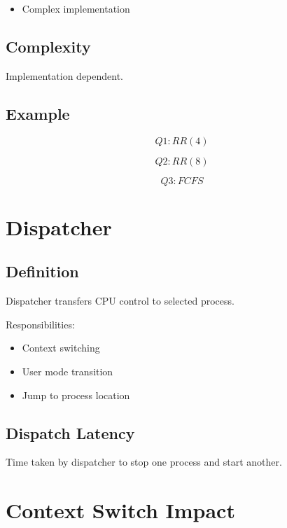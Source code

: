 \begin{itemize}
\item Complex implementation
\end{itemize}

\subsection{Complexity}

Implementation dependent.

\subsection{Example}

\[
Q1: RR(4)
\]

\[
Q2: RR(8)
\]

\[
Q3: FCFS
\]

\section{Dispatcher}

\subsection{Definition}

Dispatcher transfers CPU control to selected process.

Responsibilities:

\begin{itemize}
\item Context switching
\item User mode transition
\item Jump to process location
\end{itemize}

\subsection{Dispatch Latency}

Time taken by dispatcher to stop one process and start another.

\section{Context Switch Impact}

